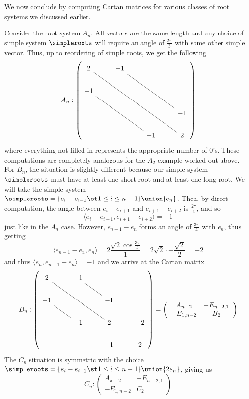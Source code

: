 \documentclass[11pt,leqno,oneside]{amsart}
\numberwithin{thm}{section}
\begin{document}
We now conclude by computing Cartan matrices for various classes of
root systems we discussed earlier.
\begin{example}
  Consider the root system \(A_n\). All vectors are the same length
  and any choice of simple system \(\simpleroots\) will require an
  angle of 
  \(\frac{2\pi}{3}\) with some other simple vector. Thus, up to
  reordering of simple roots, we get the following \[
A_n: \left(
  \begin{tikzcd}
    2\ar[rrrddd, dash]&-1\ar[rrdd, dash]&&\\
    -1\ar[rrdd,dash]&&&\\
    &&&-1\\
    &&-1&2
  \end{tikzcd}
\right)
\]
where everything not filled in represents the appropriate number of
\(0\)'s. These computations are completely analogous for the \(A_2\)
example worked out above. \\

For \(B_n\), the situation is slightly different because our simple
system \(\simpleroots\) must have at least one short root and at least
one long root. We will take the simple system
\(\simpleroots=\{e_i-e_{i+1} \st 1 \leq i \leq n-1\} \union
\{e_n\}\). Then, by direct computation, the angle between
\(e_i-e_{i+1}\) and \(e_{i+1}-e_{i+2}\) is \(\frac{2\pi}{3}\), and
so \[
  \langle e_i-e_{i+1},e_{i+1}-e_{i+2} \rangle = -1
\]
just like in the \(A_n\) case. However, \(e_{n-1}-e_n\) forms an
angle of \(\frac{3\pi}{4}\) with \(e_n\), thus getting \[
  \langle e_{n-1}-e_n, e_n \rangle = 2\frac{\sqrt{2}\cos
    \frac{3\pi}{4}}{1} = 2 \sqrt{2} \cdot -\frac{\sqrt{2}}{2} = -2
\]
and thus \(\langle e_n, e_{n-1}-e_n \rangle = -1\) and we arrive at
the Cartan matrix \[
  B_n : \left(
    \begin{tikzcd}
      2\ar[rrdd, dash]&-1\ar[rd,dash]&&\\
      -1\ar[rd, dash]&&-1&\\
      &-1&2&-2\\
      &&-1&2
    \end{tikzcd}
\right) = \left(
  \begin{array}{cc}
    A_{n-2}&-E_{n-2,1} \\
    -E_{1,n-2}&B_2
  \end{array}
\right)
\]
The \(C_n\) situation is symmetric with the choice \(\simpleroots =
\{e_i-e_{i+1} \st 1 \leq i \leq n-1\} \union \{2e_n\}\), giving us \[
  C_n: \left(
    \begin{array}{cc}
      A_{n-2}&-E_{n-2,1}\\
      -E_{1,n-2}&C_2
    \end{array}
\right)
\] \\


\end{example}
\end{document}
